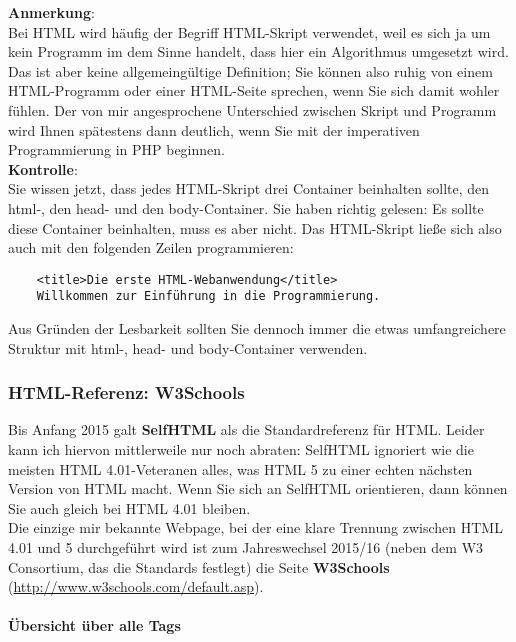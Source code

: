 \textbf{Anmerkung}:\\

Bei HTML wird häufig der Begriff HTML-Skript verwendet, weil es sich ja um kein Programm im dem Sinne handelt, dass hier ein Algorithmus umgesetzt wird. Das ist aber keine allgemeingültige Definition; Sie können also ruhig von einem HTML-Programm oder einer HTML-Seite sprechen, wenn Sie sich damit wohler fühlen. Der von mir angesprochene Unterschied zwischen Skript und Programm wird Ihnen spätestens dann deutlich, wenn Sie mit der imperativen Programmierung in PHP beginnen.\\

\textbf{Kontrolle}:\\

Sie wissen jetzt, dass jedes HTML-Skript drei Container beinhalten sollte, den html-, den head- und den body-Container. Sie haben richtig gelesen: Es sollte diese Container beinhalten, muss es aber nicht. Das HTML-Skript ließe sich also auch mit den folgenden Zeilen programmieren:\\

\begin{verbatim}
	<title>Die erste HTML-Webanwendung</title>
	Willkommen zur Einführung in die Programmierung.
\end{verbatim}

Aus Gründen der Lesbarkeit sollten Sie dennoch immer die etwas umfangreichere Struktur mit html-, head- und body-Container verwenden.

\subsubsection{HTML-Referenz: W3Schools}

Bis Anfang 2015 galt \textbf{SelfHTML} als die Standardreferenz für HTML. Leider kann ich hiervon mittlerweile nur noch abraten: SelfHTML ignoriert wie die meisten HTML 4.01-Veteranen alles, was HTML 5 zu einer echten nächsten Version von HTML macht. Wenn Sie sich an SelfHTML orientieren, dann können Sie auch gleich bei HTML 4.01 bleiben.\\

Die einzige mir bekannte Webpage, bei der eine klare Trennung zwischen HTML 4.01 und 5 durchgeführt wird ist zum Jahreswechsel 2015/16 (neben dem W3 Consortium, das die Standards festlegt) die Seite \textbf{W3Schools} (\url{http://www.w3schools.com/default.asp}).

\paragraph{Übersicht über alle Tags}

